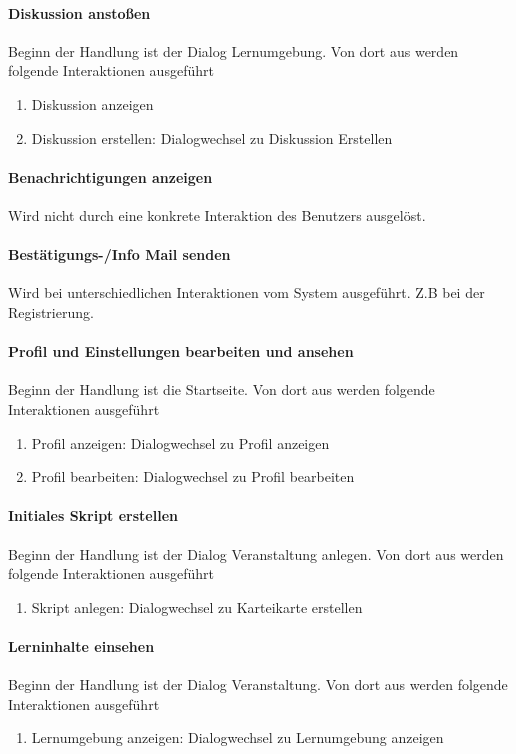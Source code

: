 \documentclass[12pt,a4paper]{article}
\begin{document}
{\paragraph{Diskussion anstoßen}
Beginn der Handlung ist der Dialog \glqq Lernumgebung\grqq. Von dort aus werden folgende Interaktionen ausgeführt
\begin{enumerate}
\item \glqq Diskussion anzeigen\grqq
\item \glqq Diskussion erstellen\grqq: Dialogwechsel zu \glqq Diskussion Erstellen\grqq
\end{enumerate}

\paragraph{Benachrichtigungen anzeigen}
Wird nicht durch eine konkrete Interaktion des Benutzers ausgelöst.

\paragraph{Bestätigungs-/Info Mail senden}
Wird bei unterschiedlichen Interaktionen vom System ausgeführt. Z.B bei der Registrierung.

\paragraph{Profil und Einstellungen bearbeiten und ansehen}
Beginn der Handlung ist die Startseite. Von dort aus werden folgende Interaktionen ausgeführt
\begin{enumerate}
\item \glqq Profil anzeigen\grqq: Dialogwechsel zu \glqq Profil anzeigen\grqq
\item \glqq Profil bearbeiten\grqq: Dialogwechsel zu \glqq Profil bearbeiten\grqq
\end{enumerate}
\paragraph{Initiales Skript erstellen}
Beginn der Handlung ist der Dialog \glqq Veranstaltung anlegen\grqq. Von dort aus werden folgende Interaktionen ausgeführt
\begin{enumerate}
\item \glqq Skript anlegen\grqq: Dialogwechsel zu \glqq Karteikarte erstellen\grqq
\end{enumerate}

\paragraph{Lerninhalte einsehen}
Beginn der Handlung ist der Dialog \glqq Veranstaltung\grqq. Von dort aus werden folgende Interaktionen ausgeführt
\begin{enumerate}
\item \glqq Lernumgebung anzeigen\grqq: Dialogwechsel zu \glqq Lernumgebung anzeigen\grqq
\end{enumerate}

}
\end{document}

